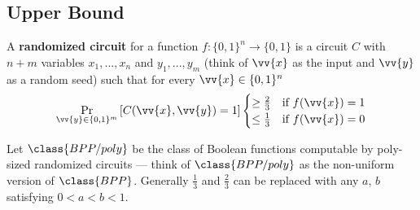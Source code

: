 \subsection{Upper Bound}
\begin{definition}
	\label{def:randomizedcircuit}
	A \textbf{randomized circuit} for a function $f: \{0,1\}^n \rightarrow \{0,1\}$ is a circuit $C$ with $n + m$ variables $x_1, ..., x_n$ and $y_1, ..., y_m$ (think of $\vv{x}$ as the input and $\vv{y}$ as a random seed) such that for every $\vv{x} \in \{0,1\}^n$
	\[\Pr_{\vv{y} \in \{0,1\}^m}\left[C(\vv{x}, \vv{y}) = 1\right] \begin{cases}
	\geq \frac{2}{3} &\mbox{if $f(\vv{x}) = 1$}\\
	\leq \frac{1}{3} &\mbox{if $f(\vv{x}) = 0$}
	\end{cases}\]
\end{definition}
Let $\class{BPP/poly}$ be the class of Boolean functions computable by poly-sized randomized circuits --- think of $\class{BPP/poly}$ as the non-uniform version of $\class{BPP}$. Generally $\frac{1}{3}$ and $\frac{2}{3}$ can be replaced with any $a$, $b$ satisfying $0 < a < b < 1$. 

